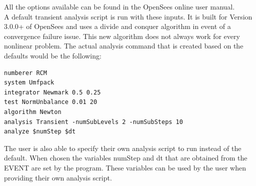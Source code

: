All the options available can be found in the OpenSees online user
manual.\\

A default transient analysis script is run with these inputs. It is
built for Version 3.0.0+ of OpenSees and uses a divide and conquer
algorithm in event of a convergence failure issue. This new algorithm
does not always work for every nonlinear problem. The actual analysis command
that is created based on the defaults would be the following:

\begin{verbatim}
numberer RCM
system Umfpack
integrator Newmark 0.5 0.25
test NormUnbalance 0.01 20 
algorithm Newton
analysis Transient -numSubLevels 2 -numSubSteps 10 
analyze $numStep $dt
\end{verbatim}



The user is also able to specify their own analysis script to run
instead of the default. When chosen the variables numStep and dt that
are obtained from the EVENT are set by the program. These variables
can be used by the user when providing their own analysis script.
